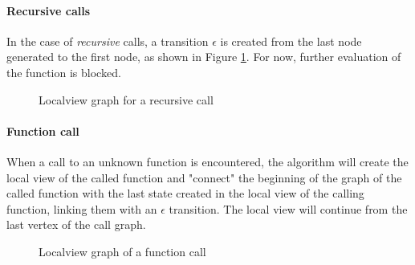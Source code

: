 \paragraph{Recursive calls}
In the case of \textit{recursive} calls, a transition $\epsilon$ is created from the last  
node generated to the first node, as shown in Figure \ref{grafo:ricors}.
For now, further evaluation of the function is blocked.

\begin{figure}[ht!]
    \centering
    \caption{Localview graph for a recursive call}
    \label{grafo:ricors}
\end{figure}

\paragraph{Function call}
When a call to an unknown function is encountered, the algorithm will create the local  
view of the called function and "connect" the beginning of the graph of the called  
function with the last state created in the local view of the calling function, linking  
them with an $\epsilon$ transition. The local view will continue from the last vertex of  
the call graph.

\begin{figure}[ht!]
    \centering
    \caption{Localview graph of a function call}
    \label{grafo:funcall}
\end{figure}

